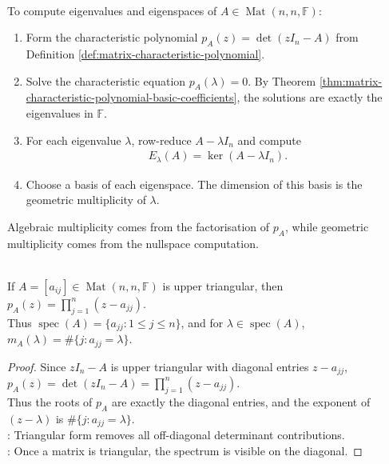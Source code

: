 \begin{method} \label{meth:characteristic-equation-eigenspace-computation} \\
To compute eigenvalues and eigenspaces of $A\in\operatorname{Mat}(n,n,\mathbb{F})$:
\begin{enumerate}[label=(\roman*)]
\setlength{\itemsep}{0pt}
\item Form the characteristic polynomial $p_A(z)=\det(zI_n-A)$ from Definition \ref{def:matrix-characteristic-polynomial}.
\item Solve the characteristic equation $p_A(\lambda)=0$. By Theorem \ref{thm:matrix-characteristic-polynomial-basic-coefficients}, the solutions are exactly the eigenvalues in $\mathbb{F}$.
\item For each eigenvalue $\lambda$, row-reduce $A-\lambda I_n$ and compute
\begin{align}
E_{\lambda}(A)=\ker(A-\lambda I_n). \nonumber
\end{align}
\item Choose a basis of each eigenspace. The dimension of this basis is the geometric multiplicity of $\lambda$.
\end{enumerate}
Algebraic multiplicity comes from the factorisation of $p_A$, while geometric multiplicity comes from the nullspace computation.
\end{method}

\begin{proposition} \label{prop:upper-triangular-characteristic-polynomial} \\
If $A=[a_{ij}]\in\operatorname{Mat}(n,n,\mathbb{F})$ is upper triangular, then $p_A(z)=\prod\limits_{j=1}^{n}(z-a_{jj})$.\\
Thus $\operatorname{spec}(A)=\{a_{jj}:1\leq j\leq n\}$, and for $\lambda\in\operatorname{spec}(A)$, $m_A(\lambda)=\#\{j:a_{jj}=\lambda\}$.
\begin{proof}
Since $zI_n-A$ is upper triangular with diagonal entries $z-a_{jj}$, $p_A(z)=\det(zI_n-A)=\prod\limits_{j=1}^{n}(z-a_{jj})$.\\
Thus the roots of $p_A$ are exactly the diagonal entries, and the exponent of $(z-\lambda)$ is $\#\{j:a_{jj}=\lambda\}$.\\
: Triangular form removes all off-diagonal determinant contributions.\\
: Once a matrix is triangular, the spectrum is visible on the diagonal.
\end{proof}
\end{proposition}


